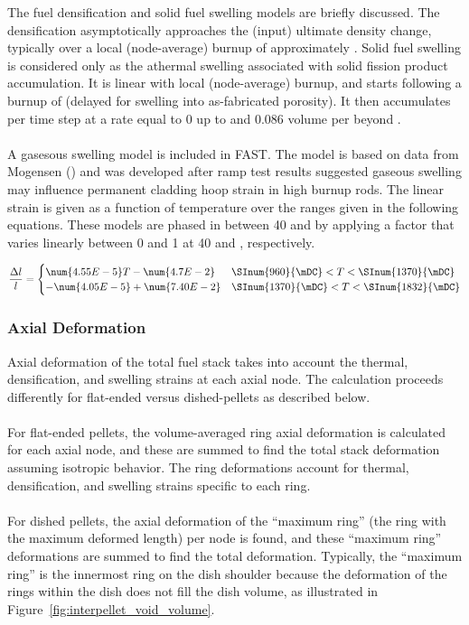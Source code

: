 The fuel densification and solid fuel swelling models are briefly discussed. The densification
asymptotically approaches the (input) ultimate density change, typically over a local (node-average)
burnup of approximately . Solid fuel swelling is considered only as the athermal
swelling associated with solid fission product accumulation. It is linear with local (node-average)
burnup, and starts following a burnup of  (delayed for swelling into as-fabricated
porosity).  It then accumulates per time step at a rate equal to
0 up to  and 0.086 volume \percent per
 beyond  \cite{ref:Luscher2014b}.
\\
\\
A gasesous swelling model is included in FAST. The model is based on data from Mogensen
(\cite{ref:Mogensen1985b}) and was developed after ramp test results suggested gaseous
swelling may influence permanent cladding hoop strain in high burnup rods. The linear strain is
given as a function of temperature over the ranges given in the following equations. These models
are phased in between 40 and  by applying a factor that varies linearly between 0
and 1 at 40 and , respectively.

\begin{equation}
    \frac{\Delta l}{l} = 
    \begin{cases}
        \num{4.55E-5}T-\num{4.7E-2}     & \SInum{960}{\mDC} < T < \SInum{1370}{\mDC} \\
        -\num{4.05E-5}+\num{7.40E-2}    & \SInum{1370}{\mDC} < T < \SInum{1832}{\mDC}
    \end{cases}
\end{equation}

\subsubsection{Axial Deformation}\label{section:axial-deformation}

Axial deformation of the total fuel stack takes into account the thermal, densification, and
swelling strains at each axial node. The calculation proceeds differently for flat-ended versus
dished-pellets as described below.
\\
\\
For flat-ended pellets, the volume-averaged ring axial deformation is calculated for each axial
node, and these are summed to find the total stack deformation assuming isotropic behavior. The ring
deformations account for thermal, densification, and swelling strains specific to each ring.
\\
\\
For dished pellets, the axial deformation of the ``maximum ring'' (the ring with the maximum deformed
length) per node is found, and these ``maximum ring'' deformations are summed to find the total
deformation.  Typically, the ``maximum ring'' is the innermost ring on the dish shoulder because the
deformation of the rings within the dish does not fill the dish volume, as illustrated in
Figure~\ref{fig:interpellet_void_volume}.

